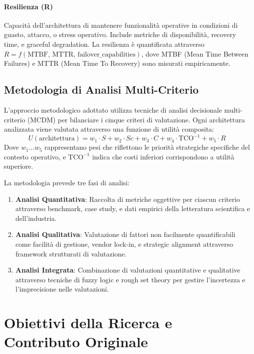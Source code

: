 \documentclass[12pt,a4paper,oneside]{book}
\begin{document}
\paragraph{Resilienza (R)} Capacità dell'architettura di mantenere funzionalità operative in condizioni di guasto, attacco, o stress operativo. Include metriche di disponibilità, recovery time, e graceful degradation. La resilienza è quantificata attraverso $R = f(\text{MTBF, MTTR, failover\_capabilities})$, dove MTBF (Mean Time Between Failures) e MTTR (Mean Time To Recovery) sono misurati empiricamente.

\subsection{Metodologia di Analisi Multi-Criterio}
\label{ssec:metodologia_analisi}

L'approccio metodologico adottato utilizza tecniche di analisi decisionale multi-criterio (MCDM) per bilanciare i cinque criteri di valutazione. Ogni architettura analizzata viene valutata attraverso una funzione di utilità composita:
\[
U(\text{architettura}) = w_1 \cdot S + w_2 \cdot Sc + w_3 \cdot C + w_4 \cdot \text{TCO}^{-1} + w_5 \cdot R
\]
Dove $w_1...w_5$ rappresentano pesi che riflettono le priorità strategiche specifiche del contesto operativo, e $\text{TCO}^{-1}$ indica che costi inferiori corrispondono a utilità superiore.

La metodologia prevede tre fasi di analisi:
\begin{enumerate}
    \item \textbf{Analisi Quantitativa}: Raccolta di metriche oggettive per ciascun criterio attraverso benchmark, case study, e dati empirici della letteratura scientifica e dell'industria.
    \item \textbf{Analisi Qualitativa}: Valutazione di fattori non facilmente quantificabili come facilità di gestione, vendor lock-in, e strategic alignment attraverso framework strutturati di valutazione.
    \item \textbf{Analisi Integrata}: Combinazione di valutazioni quantitative e qualitative attraverso tecniche di fuzzy logic e rough set theory per gestire l'incertezza e l'imprecisione nelle valutazioni.
\end{enumerate}

\section{Obiettivi della Ricerca e Contributo Originale}
\label{sec:obiettivi}
\end{document}
